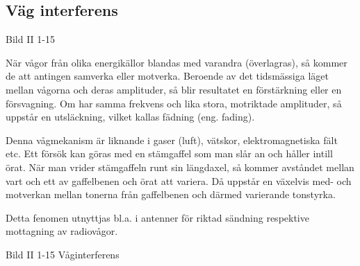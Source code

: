 \subsection{Väg interferens}

Bild II 1-15

När vågor från olika energikällor blandas med varandra (överlagras), så kommer de att
antingen samverka eller motverka. Beroende av det tidsmässiga läget mellan vågorna och
deras amplituder, så blir resultatet en förstärkning eller en försvagning. Om har samma
frekvens och lika stora, motriktade amplituder, så uppstår en utsläckning, vilket kallas
fädning (eng. fading).

Denna vågmekanism är liknande i gaser (luft), vätskor, elektromagnetiska fält etc. Ett
försök kan göras med en stämgaffel som man slår an och håller intill örat. När man
vrider stämgaffeln runt sin längdaxel, så kommer avståndet mellan vart och ett av
gaffelbenen och örat att variera. Då uppstår en växelvis med- och motverkan mellan tonerna
från gaffelbenen och därmed varierande tonstyrka.

Detta fenomen utnyttjas bl.a. i antenner för riktad sändning respektive mottagning av
radiovågor.

Bild II 1-15 Våginterferens
